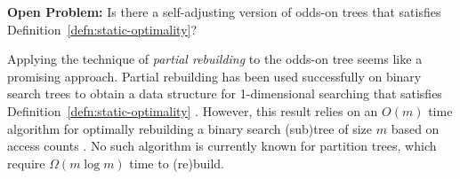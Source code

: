 \documentclass{patmorin}
\newcommand{\defref}[1]{Definition~\ref{defn:#1}}
\begin{document}
\noindent\textbf{Open Problem:} Is there a self-adjusting version of
odds-on trees that satisfies \defref{static-optimality}?

Applying the technique of \emph{partial rebuilding} \cite{o83} to the
odds-on tree seems like a promising approach.  Partial rebuilding has
been used successfully on binary search trees to obtain a data structure
for 1-dimensional searching that satisfies \defref{static-optimality}
\cite{g00}.  However, this result relies on an $O(m)$ time algorithm
for optimally rebuilding a binary search (sub)tree of size $m$ based
on access counts \cite{m77}. No such algorithm is currently known for
partition trees, which require $\Omega(m\log m)$ time to (re)build.




\end{document}

